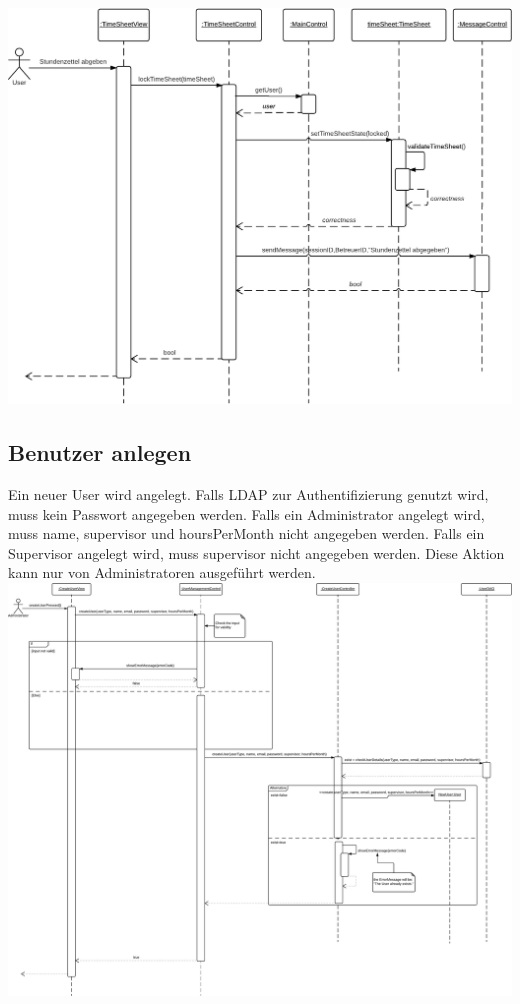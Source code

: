         \includegraphics[width=\linewidth]{Diagramms/sequenzes/send_in_timesheet.pdf}

    \newpage
    \subsection{Benutzer anlegen}
        Ein neuer User wird angelegt.
        Falls LDAP zur Authentifizierung genutzt wird, muss kein Passwort angegeben werden.
        Falls ein Administrator angelegt wird, muss name, supervisor und hoursPerMonth nicht angegeben werden.
        Falls ein Supervisor angelegt wird, muss supervisor nicht angegeben werden.
        Diese Aktion kann nur von Administratoren ausgeführt werden.\\

        \includegraphics[width=\linewidth]{Diagramms/sequenzes/create_user.pdf}


